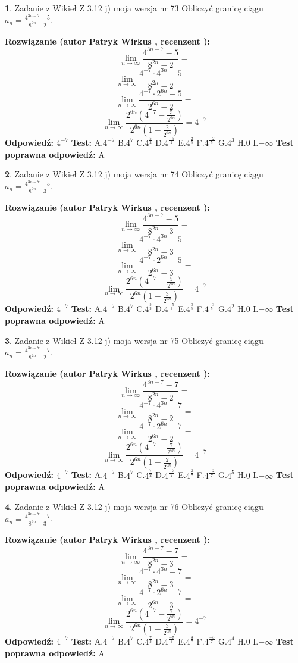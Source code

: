 \documentclass[12pt, a4paper]{article}
\theoremstyle{definition} %
\newtheorem{zad}{}
\newcommand{\zadStart}[1]{\begin{zad}#1\newline}
\newcommand{\zadStop}{\end{zad}}
\newcommand{\rozwStart}[2]{\noindent \textbf{Rozwiązanie (autor #1 , recenzent #2): }\newline}
\newcommand{\rozwStop}{\newline}
\newcommand{\odpStart}{\noindent \textbf{Odpowiedź:}\newline}
\newcommand{\odpStop}{\newline}
\newcommand{\testStart}{\noindent \textbf{Test:}\newline}
\newcommand{\testStop}{\newline}
\newcommand{\kluczStart}{\noindent \textbf{Test poprawna odpowiedź:}\newline}
\newcommand{\kluczStop}{\newline}
\begin{document}
\zadStart{Zadanie z Wikieł Z 3.12 j) moja wersja nr 73}
Obliczyć granicę ciągu $a_{n}=\frac{4^{3n-7}-5}{8^{2n}-2}$.
\zadStop
\rozwStart{Patryk Wirkus}{}
$$\lim\limits_{n\to\infty}\frac{4^{3n-7}-5}{8^{2n}-2}=$$
$$\lim\limits_{n\to\infty}\frac{4^{-7} \cdot 4^{3n}-5}{8^{2n}-2}=$$
$$\lim\limits_{n\to\infty}\frac{4^{-7} \cdot 2^{6n}-5}{2^{6n}-2}=$$
$$\lim\limits_{n\to\infty}\frac{2^{6n}(4^{-7} - \frac{5}{2^{6n}})}{2^{6n}(1-\frac{2}{2^{6n}})}= 4^{-7}$$
\rozwStop
\odpStart
$4^{-7}$
\odpStop
\testStart
A.$4^{-7}$
B.$4^{7}$
C.$4^{\frac{5}{2}}$
D.$4^{\frac{-5}{2}}$
E.$4^{\frac{2}{5}}$
F.$4^{\frac{-2}{5}}$
G.$4^{3}$
H.$0$
I.$-\infty$
\testStop
\kluczStart
A
\kluczStop



\zadStart{Zadanie z Wikieł Z 3.12 j) moja wersja nr 74}
Obliczyć granicę ciągu $a_{n}=\frac{4^{3n-7}-5}{8^{2n}-3}$.
\zadStop
\rozwStart{Patryk Wirkus}{}
$$\lim\limits_{n\to\infty}\frac{4^{3n-7}-5}{8^{2n}-3}=$$
$$\lim\limits_{n\to\infty}\frac{4^{-7} \cdot 4^{3n}-5}{8^{2n}-3}=$$
$$\lim\limits_{n\to\infty}\frac{4^{-7} \cdot 2^{6n}-5}{2^{6n}-3}=$$
$$\lim\limits_{n\to\infty}\frac{2^{6n}(4^{-7} - \frac{5}{2^{6n}})}{2^{6n}(1-\frac{3}{2^{6n}})}= 4^{-7}$$
\rozwStop
\odpStart
$4^{-7}$
\odpStop
\testStart
A.$4^{-7}$
B.$4^{7}$
C.$4^{\frac{5}{3}}$
D.$4^{\frac{-5}{3}}$
E.$4^{\frac{3}{5}}$
F.$4^{\frac{-3}{5}}$
G.$4^{2}$
H.$0$
I.$-\infty$
\testStop
\kluczStart
A
\kluczStop



\zadStart{Zadanie z Wikieł Z 3.12 j) moja wersja nr 75}
Obliczyć granicę ciągu $a_{n}=\frac{4^{3n-7}-7}{8^{2n}-2}$.
\zadStop
\rozwStart{Patryk Wirkus}{}
$$\lim\limits_{n\to\infty}\frac{4^{3n-7}-7}{8^{2n}-2}=$$
$$\lim\limits_{n\to\infty}\frac{4^{-7} \cdot 4^{3n}-7}{8^{2n}-2}=$$
$$\lim\limits_{n\to\infty}\frac{4^{-7} \cdot 2^{6n}-7}{2^{6n}-2}=$$
$$\lim\limits_{n\to\infty}\frac{2^{6n}(4^{-7} - \frac{7}{2^{6n}})}{2^{6n}(1-\frac{2}{2^{6n}})}= 4^{-7}$$
\rozwStop
\odpStart
$4^{-7}$
\odpStop
\testStart
A.$4^{-7}$
B.$4^{7}$
C.$4^{\frac{7}{2}}$
D.$4^{\frac{-7}{2}}$
E.$4^{\frac{2}{7}}$
F.$4^{\frac{-2}{7}}$
G.$4^{5}$
H.$0$
I.$-\infty$
\testStop
\kluczStart
A
\kluczStop



\zadStart{Zadanie z Wikieł Z 3.12 j) moja wersja nr 76}
Obliczyć granicę ciągu $a_{n}=\frac{4^{3n-7}-7}{8^{2n}-3}$.
\zadStop
\rozwStart{Patryk Wirkus}{}
$$\lim\limits_{n\to\infty}\frac{4^{3n-7}-7}{8^{2n}-3}=$$
$$\lim\limits_{n\to\infty}\frac{4^{-7} \cdot 4^{3n}-7}{8^{2n}-3}=$$
$$\lim\limits_{n\to\infty}\frac{4^{-7} \cdot 2^{6n}-7}{2^{6n}-3}=$$
$$\lim\limits_{n\to\infty}\frac{2^{6n}(4^{-7} - \frac{7}{2^{6n}})}{2^{6n}(1-\frac{3}{2^{6n}})}= 4^{-7}$$
\rozwStop
\odpStart
$4^{-7}$
\odpStop
\testStart
A.$4^{-7}$
B.$4^{7}$
C.$4^{\frac{7}{3}}$
D.$4^{\frac{-7}{3}}$
E.$4^{\frac{3}{7}}$
F.$4^{\frac{-3}{7}}$
G.$4^{4}$
H.$0$
I.$-\infty$
\testStop
\kluczStart
A
\kluczStop
\end{document}
